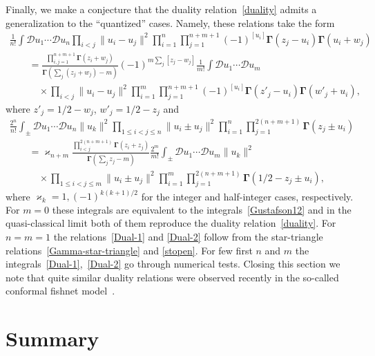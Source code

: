 \documentclass[pdftex]{sigma}
\numberwithin{equation}{section}
\begin{document}
Finally, we make a conjecture that the duality relation~\eqref{duality} admits a generalization to the ``quantized'' cases. Namely, these relations take the form
\begin{gather}
 \frac1{n!} \int\mathcal{D}u_1 \cdots\mathcal{D}u_n \prod_{i<j}\|u_i-u_j\|^2
 \prod_{i=1}^n \prod_{j=1}^{n+m+1} (-1)^{[u_i]}
\boldsymbol\Gamma(z_j-u_i)\boldsymbol\Gamma(u_i+w_j)\nonumber\\
\qquad{} =\frac{\prod\limits_{i,j=1}^{n+m+1}\boldsymbol \Gamma(z_i+w_j)}{
\boldsymbol\Gamma\left(\sum_j (z_j+w_j)-m\right)} (-1)^{m \sum_j [z_j-w_j]}
\frac1{m!} \int\mathcal{D}u_1 \cdots\mathcal{D}u_m \nonumber\\
\qquad\quad{}\times \prod_{i<j}\|u_i-u_j\|^2 \prod_{i=1}^m \prod_{j=1}^{n+m+1} (-1)^{[u_i]}
\boldsymbol\Gamma(z'_j-u_i)\boldsymbol\Gamma(w'_j+u_i),\label{Dual-1}
\end{gather}
where $z'_j=1/2-w_j$, $w'_j=1/2-z_j$ and
\begin{gather}
 \frac{2^n}{n!} \int_\pm
\mathcal{D}u_1 \cdots\mathcal{D}u_n \|u_k\|^2 \prod_{1\leq i<j\leq n}\|u_i\pm u_j\|^2
\prod_{i=1}^n \prod_{j=1}^{2(n+m+1)}
\boldsymbol\Gamma(z_j\pm u_i)\nonumber\\
\qquad{} =\varkappa_{n+m}\frac{\prod\limits_{i<j}^{2(n+m+1)}\boldsymbol \Gamma(z_i+z_j)}{
\boldsymbol\Gamma\left(\sum_j z_j-m\right)} \frac{2^m}{m!} \int_\pm\mathcal{D}u_1 \cdots\mathcal{D}u_m \|u_k\|^2 \nonumber\\
\qquad\quad{}\times \prod_{1\leq i<j\leq m}\|u_i\pm u_j\|^2 \prod_{i=1}^m \prod_{j=1}^{2(n+m+1)}\boldsymbol\Gamma(1/2-z_j\pm u_i),\label{Dual-2}
\end{gather}
where $\varkappa_k=1,(-1)^{k(k+1)/2}$ for the integer and half-integer cases, respectively. For $m=0$ these integrals
are equivalent to the integrals~\eqref{Gustafson12} and in the quasi-classical limit both of them reproduce the
duality relation~\eqref{duality}. For $n=m=1$ the relations~\eqref{Dual-1} and \eqref{Dual-2} follow from the
star-triangle relations~\eqref{Gamma-star-triangle} and \eqref{stopen}. For few first $n$ and $m$ the
integrals~\eqref{Dual-1},~\eqref{Dual-2} go through numerical tests. Closing this section we note that quite similar
duality relations were observed recently in the so-called conformal fishnet model~\cite{Derkachov:2018rot}.

\section{Summary}\label{sect:summary}
\end{document}
